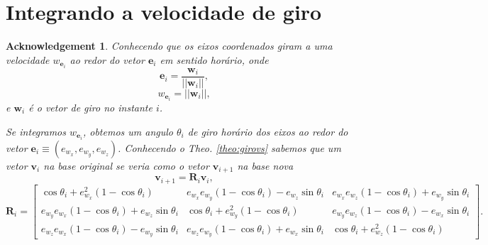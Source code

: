 \documentclass[a4paper,10pt]{report}
\newtheorem{acknowledgement}[theorem]{Acknowledgement}
\begin{document}
\section{Integrando a velocidade de giro}
\begin{acknowledgement}
Conhecendo que os eixos coordenados giram a uma velocidade $w_{\mathbf{e}_i}$
ao redor do vetor $\mathbf{e}_i$ em sentido horário, onde
\begin{equation}
 \mathbf{e}_i=\frac{\mathbf{w}_i}{||\mathbf{w}_i||},
\end{equation}
\begin{equation}
 w_{\mathbf{e}_i}=||\mathbf{w}_i||,
\end{equation}
e $\mathbf{w}_i$ é o vetor de giro no instante $i$.

Se integramos $w_{\mathbf{e}_i}$, obtemos um angulo $\theta_i$ de giro horário dos eixos
ao redor do vetor $\mathbf{e}_i \equiv (e_{w_x},e_{w_y},e_{w_z})$.
Conhecendo o Theo. \ref{theo:girovs} sabemos que um vetor $ \mathbf{v}_i$ na base original
se veria como o vetor  $\mathbf{v}_{i+1}$ na base nova
 \begin{equation}
\mathbf{v}_{i+1} = \mathbf{R}_i \mathbf{v}_i , 
\end{equation}
\begin{equation}
  \mathbf{R}_i = \begin{bmatrix} \cos \theta_i +e_{w_x}^2 \left(1-\cos \theta_i\right) & e_{w_x} e_{w_y} \left(1-\cos \theta_i\right) - e_{w_z} \sin \theta_i & e_{w_x} e_{w_z} \left(1-\cos \theta_i\right) + e_{w_y} \sin \theta_i \\ e_{w_y} e_{w_x} \left(1-\cos \theta_i\right) + e_{w_z} \sin \theta_i & \cos \theta_i + e_{w_y}^2\left(1-\cos \theta_i\right) & e_{w_y} e_{w_z} \left(1-\cos \theta_i\right) - e_{w_x} \sin \theta_i \\ e_{w_z} e_{w_x} \left(1-\cos \theta_i\right) - e_{w_y} \sin \theta_i & e_{w_z} e_{w_y} \left(1-\cos \theta_i\right) + e_{w_x} \sin \theta_i & \cos \theta_i + e_{w_z}^2\left(1-\cos \theta_i\right) \end{bmatrix}. 
\end{equation}

\end{acknowledgement}
\end{document}
